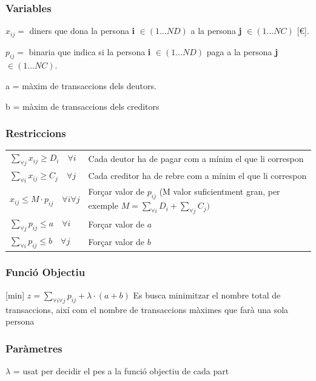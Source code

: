 \subsubsection{Variables}
\begin{description}
\item $x_{ij}=$ diners que dona la persona \textbf{i} $\in (1 \ldots ND)$ a la persona \textbf{j} $\in (1 \ldots NC)$  [€].
\item $p_{ij}=$ binaria que indica si la persona \textbf{i} $\in (1 \ldots ND)$ paga a la persona \textbf{j} $\in (1 \ldots NC)$.
\item a = màxim de transaccions dels deutors.
\item b = màxim de transaccions dels creditors
\end{description}

\subsubsection{Restriccions}
\begin{tabular}{l l}
$\sum\limits_{\forall j} x_{ij} \geq D_{i} \quad \forall i$ & Cada deutor ha de pagar com a mínim el que li correspon \\

$\sum\limits_{\forall i} x_{ij} \geq C_{j} \quad \forall j$ & Cada creditor ha de rebre com a mínim el que li correspon \\

$x_{ij} \leq M \cdot p_{ij} \quad \forall i \forall j$ & Forçar valor de $p_{ij}$ (M valor suficientment gran, per exemple $M=\sum\limits_{\forall i} D_{i} + \sum\limits_{\forall j} C_{j})$\\

$\sum\limits_{\forall j} p_{ij} \leq a \quad \forall i$ & Forçar valor de $a$ \\

$\sum\limits_{\forall i} p_{ij} \leq b \quad \forall j$ & Forçar valor de $b$ \\
\end{tabular}

\subsubsection{Funció Objectiu}
[min] $z = \sum\limits_{\forall i \forall j} p_{ij} + \lambda \cdot (a+b)$
Es busca minimitzar el nombre total de transaccions, així com el nombre de transaccions màximes que farà una sola persona
\subsubsection{Paràmetres}
$\lambda$ = usat per decidir el pes a la funció objectiu de cada part

